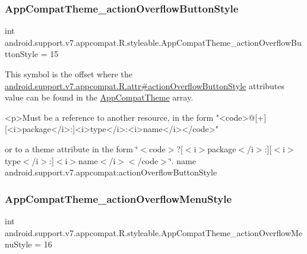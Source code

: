 \subsubsection{\texorpdfstring{App\+Compat\+Theme\+\_\+action\+Overflow\+Button\+Style}{AppCompatTheme\_actionOverflowButtonStyle}}
{\footnotesize\ttfamily int android.\+support.\+v7.\+appcompat.\+R.\+styleable.\+App\+Compat\+Theme\+\_\+action\+Overflow\+Button\+Style = 15\hspace{0.3cm}{\ttfamily [static]}}

This symbol is the offset where the \hyperlink{classandroid_1_1support_1_1v7_1_1appcompat_1_1R_1_1attr_a68be995b6a8f72f96ad87855fb5a8a7a}{android.\+support.\+v7.\+appcompat.\+R.\+attr\#action\+Overflow\+Button\+Style} attribute\textquotesingle{}s value can be found in the \hyperlink{classandroid_1_1support_1_1v7_1_1appcompat_1_1R_1_1styleable_a5c42f89e8a410c323be34208d75c430b}{App\+Compat\+Theme} array.

\begin{DoxyVerb}      <p>Must be a reference to another resource, in the form "<code>@[+][<i>package</i>:]<i>type</i>:<i>name</i></code>"
\end{DoxyVerb}
 or to a theme attribute in the form \char`\"{}$<$code$>$?\mbox{[}$<$i$>$package$<$/i$>$\+:\mbox{]}\mbox{[}$<$i$>$type$<$/i$>$\+:\mbox{]}$<$i$>$name$<$/i$>$$<$/code$>$\char`\"{}.  name android.\+support.\+v7.\+appcompat\+:action\+Overflow\+Button\+Style \mbox{\label{classandroid_1_1support_1_1v7_1_1appcompat_1_1R_1_1styleable_a50068fdeae95834f3e3fdd6649df494c}} 
\subsubsection{\texorpdfstring{App\+Compat\+Theme\+\_\+action\+Overflow\+Menu\+Style}{AppCompatTheme\_actionOverflowMenuStyle}}
{\footnotesize\ttfamily int android.\+support.\+v7.\+appcompat.\+R.\+styleable.\+App\+Compat\+Theme\+\_\+action\+Overflow\+Menu\+Style = 16\hspace{0.3cm}{\ttfamily [static]}}

